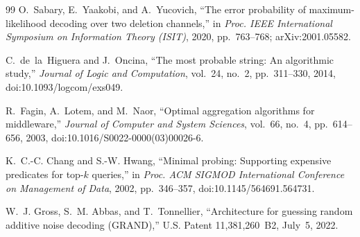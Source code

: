 \documentclass[11pt]{article}
\theoremstyle{definition}
\theoremstyle{remark}
\begin{document}
\begin{thebibliography}{99}
O.~Sabary, E.~Yaakobi, and A.~Yucovich,
``The error probability of maximum-likelihood decoding over two deletion channels,''
in \emph{Proc. IEEE International Symposium on Information Theory (ISIT)}, 2020, pp.~763--768; arXiv:2001.05582.

C.~de~la~Higuera and J.~Oncina,
``The most probable string: An algorithmic study,''
\emph{Journal of Logic and Computation}, vol.~24, no.~2, pp.~311--330, 2014, doi:10.1093/logcom/exs049.

R.~Fagin, A.~Lotem, and M.~Naor,
``Optimal aggregation algorithms for middleware,''
\emph{Journal of Computer and System Sciences}, vol.~66, no.~4, pp.~614--656, 2003, doi:10.1016/S0022-0000(03)00026-6.

K.~C.-C. Chang and S.-W. Hwang,
``Minimal probing: Supporting expensive predicates for top-$k$ queries,''
in \emph{Proc. ACM SIGMOD International Conference on Management of Data}, 2002, pp.~346--357, doi:10.1145/564691.564731.

W.~J. Gross, S.~M. Abbas, and T.~Tonnellier,
``Architecture for guessing random additive noise decoding (GRAND),''
U.S. Patent 11,381,260~B2, July~5, 2022.

\end{thebibliography}
\end{document}
